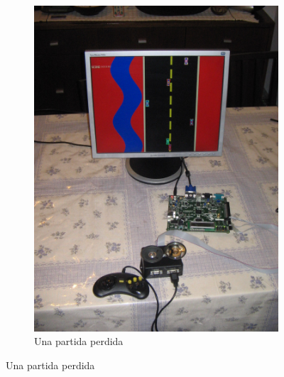 \documentclass[10pt, a4paper,english,spanish]{article}
\begin{document}
\begin{figure}[!h]
\begin{subfigure}{.5\textwidth}
	\includegraphics[width=\linewidth,angle=-90]{fotos/IMG_0208.JPG}
	\caption{Una partida perdida}
	\label{fig::lost}
\end{subfigure}
\end{figure}
\end{document}
